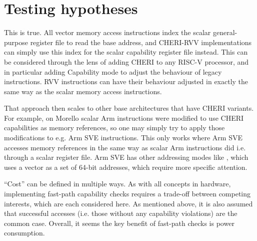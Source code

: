 \section{Testing hypotheses}

This is true.
All vector memory access instructions index the scalar general-purpose register file to read the base address, and CHERI-RVV implementations can simply use this index for the scalar capability register file instead.
This can be considered through the lens of adding CHERI to any RISC-V processor, and in particular adding Capability mode to adjust the behaviour of legacy instructions.
RVV instructions can have their behaviour adjusted in exactly the same way as the scalar memory access instructions.

That approach then scales to other base architectures that have CHERI variants.
For example, on Morello scalar Arm instructions were modified to use CHERI capabilities as memory references, so one may simply try to apply those modifications to e.g. Arm SVE instructions.
This only works where Arm SVE accesses memory references in the same way as scalar Arm instructions did i.e. through a scalar register file.
Arm SVE has other addressing modes like , which uses a vector as a set of 64-bit addresses, which require more specific attention.




\enquote{Cost} can be defined in multiple ways.
As with all concepts in hardware, implementing fast-path capability checks requires a trade-off between competing interests, which are each considered here.
As mentioned above, it is also assumed that successful accesses (i.e. those without any capability violations) are the common case.
Overall, it seems the key benefit of fast-path checks is power consumption.

